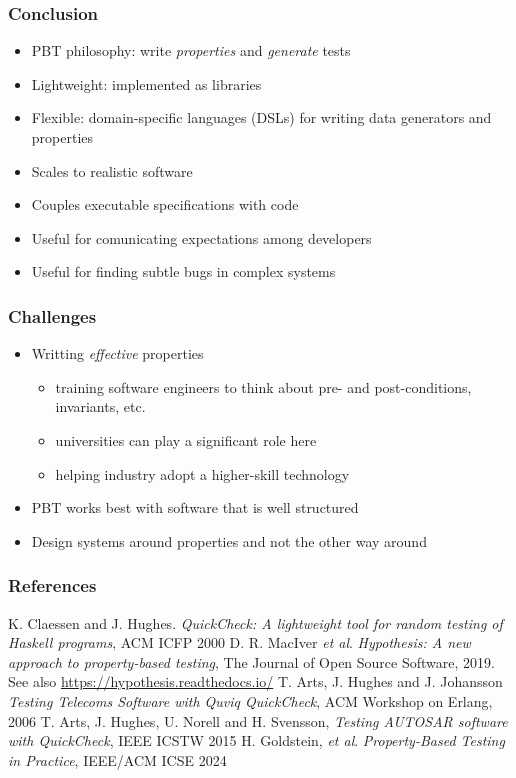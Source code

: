 \documentclass{beamer}
\begin{document}
\begin{frame}[allowframebreaks]
  \frametitle{Conclusion}

\begin{itemize}
\item PBT philosophy: write \emph{properties} and \emph{generate} tests
\item Lightweight: implemented as libraries
\item Flexible: domain-specific languages (DSLs) for writing
    data generators and properties
 \item Scales to realistic software   
\item Couples executable specifications with code
\item Useful for comunicating expectations among developers
\item Useful for finding subtle bugs in complex systems 
\end{itemize}
\end{frame}



\begin{frame}
  \frametitle{Challenges}
\begin{itemize}
\item Writting \emph{effective} properties  
  \begin{itemize}
  \item training software engineers to think about
    pre- and post-conditions, invariants, etc.
  \item universities can play a significant role here
  \item helping industry adopt a higher-skill technology 
  \end{itemize}
\item PBT works best with software that is well structured
\item Design systems around properties and not the other way around
\end{itemize}
\end{frame}

\begin{frame}
  \frametitle{References}

  \begin{thebibliography}{9}
   K. Claessen and J. Hughes.
    \emph{QuickCheck: A lightweight tool for random testing of Haskell
      programs}, ACM ICFP 2000
   D. R. MacIver \emph{et al}.
    \emph{Hypothesis: A new approach to property-based testing},
    The Journal of Open Source Software, 2019.
    See also \url{https://hypothesis.readthedocs.io/}
   T. Arts, J. Hughes and J. Johansson
    \emph{Testing Telecoms Software with Quviq QuickCheck},
    ACM Workshop on Erlang, 2006
   T. Arts, J. Hughes, U. Norell and H. Svensson,
    \emph{Testing AUTOSAR software with QuickCheck}, IEEE ICSTW 2015
   H. Goldstein, \emph{et al}. \emph{Property-Based
      Testing in Practice}, IEEE/ACM ICSE 2024
  \end{thebibliography}


\end{frame}
\end{document}

